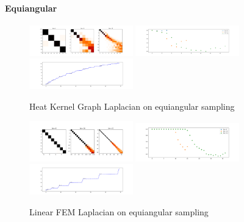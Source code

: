 \paragraph{Equiangular}
\begin{figure}[h]
	\label{fig:HeatKernelGraphLaplacianEquiangular}
	\caption{Heat Kernel Graph Laplacian on equiangular sampling}
	\centering
	\includegraphics[width=0.4\textwidth]{../codes/02.HeatKernelGraphLaplacian/equiangular/equi_full.png}
	\includegraphics[width=0.4\textwidth]{../codes/02.HeatKernelGraphLaplacian/equiangular/equi_full_diagonal.png}	
	\includegraphics[width=0.4\textwidth]{../codes/02.HeatKernelGraphLaplacian/equiangular/equi_full_eigenvalues_16.png}	
\end{figure}


\begin{figure}[h]
	\label{fig:FEMequiangular}
	\caption{Linear FEM Laplacian on equiangular sampling}
	\centering
	\includegraphics[width=0.4\textwidth]{../codes/03.FEM_laplacian/equiangular/normal/img/linearFEM.png}
	\includegraphics[width=0.4\textwidth]{../codes/03.FEM_laplacian/equiangular/normal/img/linearFEM_diagonal.png}	
	\includegraphics[width=0.4\textwidth]{../codes/03.FEM_laplacian/equiangular/normal/img/FEM_eigenvalues_16.png}	
\end{figure}

